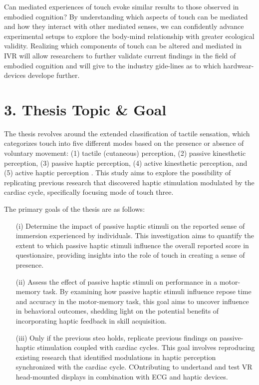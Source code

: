 \documentclass[12pt,oneside,openright]{report}
\begin{document}
Can mediated experiences of touch evoke similar results to those observed in embodied cognition? By understanding which aspects of touch can be mediated and how they interact with other mediated senses, we can confidently advance experimental setups to explore the body-mind relationship with greater ecological validity. Realizing which components of touch can be altered and mediated in IVR will allow researchers to further validate current findings in the field of embodied cognition and will give to the industry gide-lines as to which hardwear-devices develope further.  

\section*{3. Thesis Topic \& Goal}

The thesis revolves around the extended classification of tactile sensation, which categorizes touch into five different modes based on the presence or absence of voluntary movement: (1) tactile (cutaneous) perception, (2) passive kinesthetic perception, (3) passive haptic perception, (4) active kinesthetic perception, and (5) active haptic perception \cite{Healy2003HandbookOP}. This study aims to explore the possibility of replicating previous research that discovered haptic stimulation modulated by the cardiac cycle, specifically focusing mode of touch three.

The primary goals of the thesis are as follows:
  \begin{itemize}
    \item[(i)] Determine the impact of passive haptic stimuli on the reported sense of immersion experienced by individuals. This investigation aims to quantify the extent to which passive haptic stimuli influence the overall reported score in questionaire, providing insights into the role of touch in creating a sense of presence.
    \item[(ii)] Assess the effect of passive haptic stimuli on performance in a motor-memory task. By examining how passive haptic stimuli influence repose time and accuracy in the motor-memory task, this goal aims to uncover influence in behavioral outcomes, shedding light on the potential benefits of incorporating haptic feedback in skill acquisition.
    \item[(iii)] Only if the previous steo holds, replicate previous findings on passive-haptic stimulation coupled with cardiac cycles. This goal involves reproducing existing research that identified modulations in haptic perception synchronized with the cardiac cycle. COntributing to undertand and test VR head-mounted displays in combination with ECG and haptic devices.
  \end{itemize}
\end{document}
